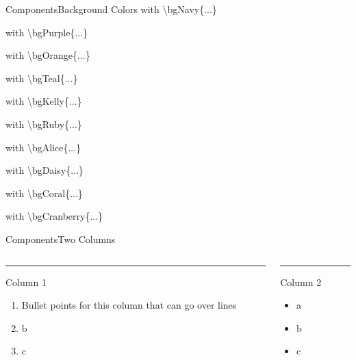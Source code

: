 \documentclass[aspectratio=169,t]{beamer}
\begin{document}
\begin{frame}{Components}{Background Colors}
   with \textbackslash bgNavy\{...\}

   with \textbackslash bgPurple\{...\}

   with \textbackslash bgOrange\{...\}

   with \textbackslash bgTeal\{...\}

   with \textbackslash bgKelly\{...\}

   with \textbackslash bgRuby\{...\}

   with \textbackslash bgAlice\{...\}

   with \textbackslash bgDaisy\{...\}

   with \textbackslash bgCoral\{...\}

   with \textbackslash bgCranberry\{...\}
\end{frame}

\begin{frame}{Components}{Two Columns}
  \begin{columns}[T]
    \begin{column}{.50\textwidth}
        \vspace{0pt}
        {\color{accent}\rule{\linewidth}{2pt}}
        Column 1

        \begin{enumerate}
            \item Bullet points for this column that can go over lines
            \item b
            \item c
        \end{enumerate}
    \end{column}
    
    \hfill
    
    \begin{column}{.50\textwidth}
        {\color{accent}\rule{\linewidth}{2pt}}
        Column 2

        \begin{itemize}
            \item a
            \item b
            \item c
        \end{itemize}
    \end{column}
  \end{columns}
\end{frame}
\end{document}
